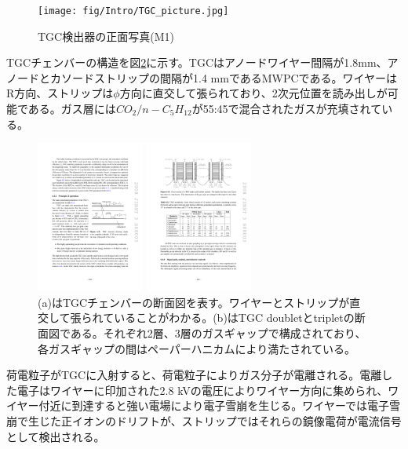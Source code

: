 \begin{figure} 
\centering
\texttt{[image: fig/Intro/TGC\_picture.jpg]}
\caption[TGC検出器]{TGC検出器の正面写真(M1)\cite{cern_document_server}}
\label{TGC_picture}
\end{figure}

TGCチェンバーの構造を図\ref{TGC_structure}に示す。TGCはアノードワイヤー間隔が1.8mm、アノードとカソードストリップの間隔が1.4 mmであるMWPCである。ワイヤーはR方向、ストリップは$\phi$方向に直交して張られており、2次元位置を読み出しが可能である。ガス層には$CO_2/n-C_5H_{12}$が55:45で混合されたガスが充填されている。

\begin{figure}
\begin{minipage}[b]{.5\linewidth}
\centering
\includegraphics[height=5cm]{fig/Intro/TGC_structure.pdf}
\end{minipage}%
\begin{minipage}[b]{.5\linewidth}
\centering
\includegraphics[height=5cm]{fig/Intro/TGC_crosssection.pdf}
\end{minipage}%
\caption[TGCチェンバーの断面図]{(a)はTGCチェンバーの断面図を表す\cite{JINST:2008}。ワイヤーとストリップが直交して張られていることがわかる。(b)はTGC doubletとtripletの断面図である。それぞれ2層、3層のガスギャップで構成されており、各ガスギャップの間はペーパーハニカムにより満たされている。}
\label{TGC_structure}
\end{figure}


荷電粒子がTGCに入射すると、荷電粒子によりガス分子が電離される。電離した電子はワイヤーに印加された2.8 kVの電圧によりワイヤー方向に集められ、ワイヤー付近に到達すると強い電場により電子雪崩を生じる。ワイヤーでは電子雪崩で生じた正イオンのドリフトが、ストリップではそれらの鏡像電荷が電流信号として検出される。


